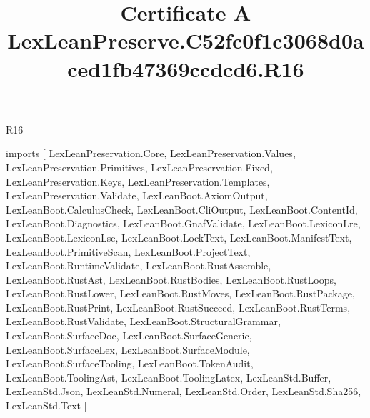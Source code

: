 \begin{lexlean}{R16}
\title{Certificate A LexLeanPreserve.C52fc0f1c3068d0aced1fb47369ccdcd6.R16}
\begin{coremodule}
imports [
  LexLeanPreservation.Core,
  LexLeanPreservation.Values,
  LexLeanPreservation.Primitives,
  LexLeanPreservation.Fixed,
  LexLeanPreservation.Keys,
  LexLeanPreservation.Templates,
  LexLeanPreservation.Validate,
  LexLeanBoot.AxiomOutput,
  LexLeanBoot.CalculusCheck,
  LexLeanBoot.CliOutput,
  LexLeanBoot.ContentId,
  LexLeanBoot.Diagnostics,
  LexLeanBoot.GnafValidate,
  LexLeanBoot.LexiconLre,
  LexLeanBoot.LexiconLse,
  LexLeanBoot.LockText,
  LexLeanBoot.ManifestText,
  LexLeanBoot.PrimitiveScan,
  LexLeanBoot.ProjectText,
  LexLeanBoot.RuntimeValidate,
  LexLeanBoot.RustAssemble,
  LexLeanBoot.RustAst,
  LexLeanBoot.RustBodies,
  LexLeanBoot.RustLoops,
  LexLeanBoot.RustLower,
  LexLeanBoot.RustMoves,
  LexLeanBoot.RustPackage,
  LexLeanBoot.RustPrint,
  LexLeanBoot.RustSucceed,
  LexLeanBoot.RustTerms,
  LexLeanBoot.RustValidate,
  LexLeanBoot.StructuralGrammar,
  LexLeanBoot.SurfaceDoc,
  LexLeanBoot.SurfaceGeneric,
  LexLeanBoot.SurfaceLex,
  LexLeanBoot.SurfaceModule,
  LexLeanBoot.SurfaceTooling,
  LexLeanBoot.TokenAudit,
  LexLeanBoot.ToolingAst,
  LexLeanBoot.ToolingLatex,
  LexLeanStd.Buffer,
  LexLeanStd.Json,
  LexLeanStd.Numeral,
  LexLeanStd.Order,
  LexLeanStd.Sha256,
  LexLeanStd.Text
]


\end{coremodule}
\end{lexlean}

